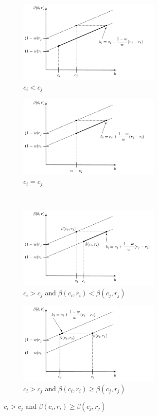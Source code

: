 \begin{figure}[htp]
	\caption{Different bidding scenarios for $r_i < r_j$}
	\label{fig:complete_N_2_1}
	\vspace{0.5cm}
	\begin{subfigure}[b]{0.5\textwidth}
	  \includegraphics[width=2.8in]{2/Figures/complete_N_2_c1}
	  \caption{$c_i < c_j$}
	  \label{fig:complete_N_2_c1}
	\end{subfigure}
	\begin{subfigure}[b]{0.5\textwidth}
	  \includegraphics[width=2.8in]{2/Figures/complete_N_2_c2}
	  \caption{$c_i = c_j$}
	  \label{fig:complete_N_2_c2}
	\end{subfigure}
	\vspace{0.5cm}\\
	\begin{subfigure}[b]{0.5\textwidth}
	  \includegraphics[width=2.8in]{2/Figures/complete_N_2_c3_1}
	  \caption{$c_i > c_j$ and $\beta(c_i,r_i) < \beta(c_j,r_j)$}
	  \label{fig:complete_N_2_c3_1}
	\end{subfigure}
	\begin{subfigure}[b]{0.5\textwidth}
	  \includegraphics[width=2.8in]{2/Figures/complete_N_2_c3_2}
	  \caption{$c_i > c_j$ and $\beta(c_i,r_i) \ge \beta(c_j,r_j)$}
	  \label{fig:complete_N_2_c3_2}
	\end{subfigure}
\end{figure}


